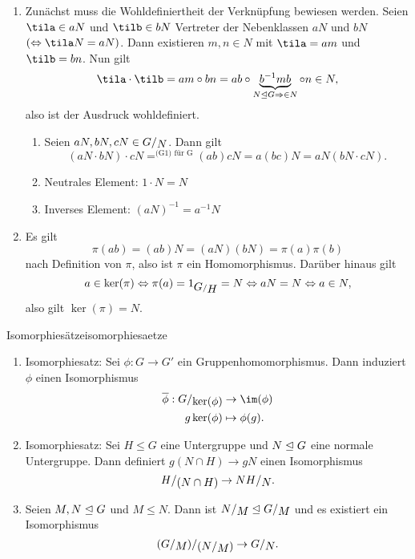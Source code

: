 \begin{beweis}
\begin{enumerate}
\item Zunächst muss die Wohldefiniertheit der Verknüpfung bewiesen werden. Seien $\tila \in aN$ und $\tilb \in bN$ Vertreter der Nebenklassen $aN$ und $bN$ $(\iff \tila N = aN)$. Dann existieren $m,n \in N$ mit $\tila = am$ und $\tilb = bn$. Nun gilt
\begin{equation}
\tila \cdot \tilb = am \circ bn = ab \circ \underbrace{b^{-1} mb}_{N \trianglelefteq G \implies \in N} \circ n \in N,
\end{equation}
also ist der Ausdruck wohldefiniert.
\begin{enumerate}[({G}1)]
\item Seien $aN, bN, cN \in \quotient{G}{N}$. Dann gilt
\begin{equation}
(aN \cdot bN) \cdot cN =^{\text{(G1) für G}} (ab)cN = a(bc)N = aN(bN \cdot cN).
\end{equation}
\item Neutrales Element: $1 \cdot N = N$
\item Inverses Element: $(aN)^{-1} = a^{-1} N$
\end{enumerate}
\item Es gilt 
\begin{equation}
\pi (ab)  = (ab)N = (aN)(bN)=\pi(a)\pi(b)
\end{equation}
nach Definition von $\pi$, also ist $\pi$ ein Homomorphismus. Darüber hinaus gilt
\begin{equation}
a \in \ker (\pi) \iff \pi(a) = 1_{\quotient{G}{H}} = N \iff aN = N \iff a \in N,
\end{equation}
also gilt $\ker (\pi) = N$.
\end{enumerate}
\end{beweis}
\begin{theorem}{Isomorphiesätze}{isomorphiesaetze}
\begin{enumerate}
\item Isomorphiesatz: Sei $\phi: G \to G'$ ein Gruppenhomomorphismus. Dann induziert $\phi$ einen Isomorphismus
\begin{align}
\overline{\phi} : \quotient{G}{\ker (\phi)} &\to \im (\phi)\\
g \ker (\phi) &\mapsto \phi(g).
\end{align}
\item Isomorphiesatz: Sei $H \leq G$ eine Untergruppe und $N \trianglelefteq G$ eine normale Untergruppe. Dann definiert $g(N \cap H) \to gN$ einen Isomorphismus 
\begin{equation}
\quotient{H}{(N\cap H)} \to \quotient{NH}{N}.
\end{equation}
\item Seien $M, N \trianglelefteq G$ und $M \leq N$. Dann ist $\quotient{N}{M} \lnormal \quotient{G}{M}$ und es existiert ein Isomorphismus
\begin{equation}
\quotient{(\quotient{G}{M})}{(\quotient{N}{M})} \to \quotient{G}{N}.
\end{equation}
\end{enumerate}
\end{theorem}

